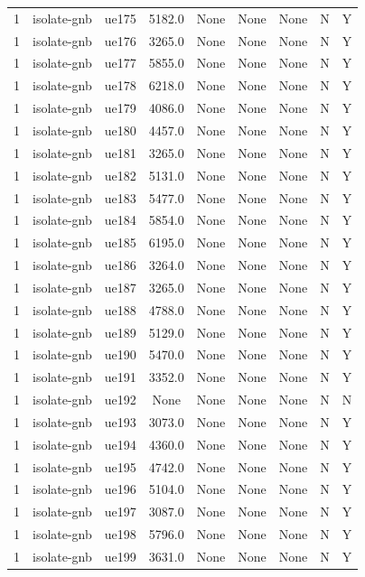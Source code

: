 \begin{table}[ht]
\begin{tabular}{|c|c|c|c|c|c|c|c|c|}
1 & isolate-gnb & ue175 & 5182.0 & None & None & None & N & Y \\
1 & isolate-gnb & ue176 & 3265.0 & None & None & None & N & Y \\
1 & isolate-gnb & ue177 & 5855.0 & None & None & None & N & Y \\
1 & isolate-gnb & ue178 & 6218.0 & None & None & None & N & Y \\
1 & isolate-gnb & ue179 & 4086.0 & None & None & None & N & Y \\
1 & isolate-gnb & ue180 & 4457.0 & None & None & None & N & Y \\
1 & isolate-gnb & ue181 & 3265.0 & None & None & None & N & Y \\
1 & isolate-gnb & ue182 & 5131.0 & None & None & None & N & Y \\
1 & isolate-gnb & ue183 & 5477.0 & None & None & None & N & Y \\
1 & isolate-gnb & ue184 & 5854.0 & None & None & None & N & Y \\
1 & isolate-gnb & ue185 & 6195.0 & None & None & None & N & Y \\
1 & isolate-gnb & ue186 & 3264.0 & None & None & None & N & Y \\
1 & isolate-gnb & ue187 & 3265.0 & None & None & None & N & Y \\
1 & isolate-gnb & ue188 & 4788.0 & None & None & None & N & Y \\
1 & isolate-gnb & ue189 & 5129.0 & None & None & None & N & Y \\
1 & isolate-gnb & ue190 & 5470.0 & None & None & None & N & Y \\
1 & isolate-gnb & ue191 & 3352.0 & None & None & None & N & Y \\
1 & isolate-gnb & ue192 & None & None & None & None & N & N \\
1 & isolate-gnb & ue193 & 3073.0 & None & None & None & N & Y \\
1 & isolate-gnb & ue194 & 4360.0 & None & None & None & N & Y \\
1 & isolate-gnb & ue195 & 4742.0 & None & None & None & N & Y \\
1 & isolate-gnb & ue196 & 5104.0 & None & None & None & N & Y \\
1 & isolate-gnb & ue197 & 3087.0 & None & None & None & N & Y \\
1 & isolate-gnb & ue198 & 5796.0 & None & None & None & N & Y \\
1 & isolate-gnb & ue199 & 3631.0 & None & None & None & N & Y \\

\end{tabular}
\end{table}

